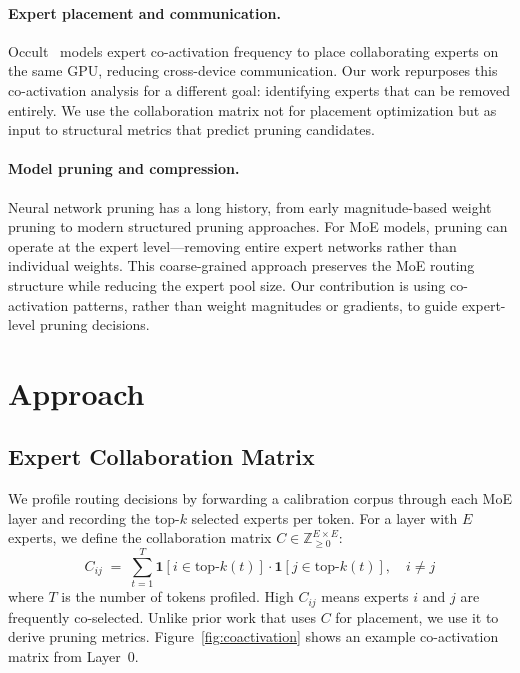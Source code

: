 \documentclass{article}
\begin{document}
\paragraph{Expert placement and communication.}
Occult~\citep{luo2025occult} models expert co-activation frequency to place
collaborating experts on the same GPU, reducing cross-device communication.
Our work repurposes this co-activation analysis for a different goal: identifying
experts that can be removed entirely.
We use the collaboration matrix not for placement optimization but as input to
structural metrics that predict pruning candidates.

\paragraph{Model pruning and compression.}
Neural network pruning has a long history, from early magnitude-based weight
pruning to modern structured pruning approaches.
For MoE models, pruning can operate at the expert level---removing entire expert
networks rather than individual weights.
This coarse-grained approach preserves the MoE routing structure while reducing
the expert pool size.
Our contribution is using co-activation patterns, rather than weight magnitudes
or gradients, to guide expert-level pruning decisions.

\section{Approach}

\subsection{Expert Collaboration Matrix}

We profile routing decisions by forwarding a calibration corpus through each MoE layer
and recording the top-$k$ selected experts per token.
For a layer with $E$ experts, we define the collaboration matrix
$C \in \mathbb{Z}_{\geq 0}^{E \times E}$:
\begin{equation}
    C_{ij} \;=\; \sum_{t=1}^{T}
        \mathbf{1}\!\left[i \in \mathrm{top\text{-}}k(t)\right]
        \cdot
        \mathbf{1}\!\left[j \in \mathrm{top\text{-}}k(t)\right],
        \quad i \neq j
    \label{eq:collab}
\end{equation}
where $T$ is the number of tokens profiled.
High $C_{ij}$ means experts $i$ and $j$ are frequently co-selected.
Unlike prior work that uses $C$ for placement, we use it to derive pruning metrics.
Figure~\ref{fig:coactivation} shows an example co-activation matrix from Layer~0.
\end{document}
